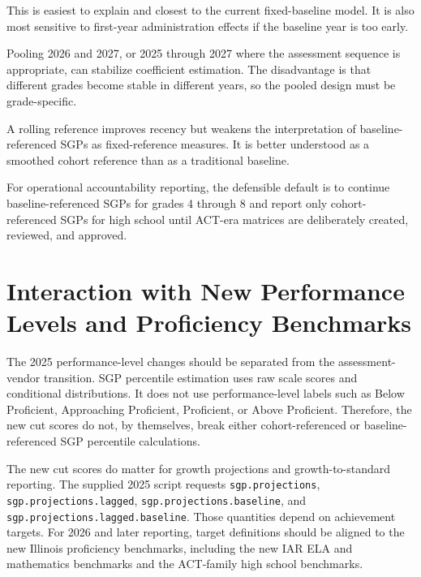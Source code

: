 \documentclass[11pt]{article}
\begin{document}
\begin{description}[leftmargin=1.8em, style=nextline]
\item[Single baseline year.] This is easiest to explain and closest to the current fixed-baseline model. It is also most sensitive to first-year administration effects if the baseline year is too early.
\item[Pooled baseline period.] Pooling 2026 and 2027, or 2025 through 2027 where the assessment sequence is appropriate, can stabilize coefficient estimation. The disadvantage is that different grades become stable in different years, so the pooled design must be grade-specific.
\item[Rolling reference.] A rolling reference improves recency but weakens the interpretation of baseline-referenced SGPs as fixed-reference measures. It is better understood as a smoothed cohort reference than as a traditional baseline.
\end{description}

For operational accountability reporting, the defensible default is to continue baseline-referenced SGPs for grades 4 through 8 and report only cohort-referenced SGPs for high school until ACT-era matrices are deliberately created, reviewed, and approved.

\section{Interaction with New Performance Levels and Proficiency Benchmarks}

The 2025 performance-level changes should be separated from the assessment-vendor transition. SGP percentile estimation uses raw scale scores and conditional distributions. It does not use performance-level labels such as Below Proficient, Approaching Proficient, Proficient, or Above Proficient. Therefore, the new cut scores do not, by themselves, break either cohort-referenced or baseline-referenced SGP percentile calculations.

The new cut scores do matter for growth projections and growth-to-standard reporting. The supplied 2025 script requests \texttt{sgp.projections}, \texttt{sgp.projections.lagged}, \texttt{sgp.projections.baseline}, and \texttt{sgp.projections.lagged.baseline}. Those quantities depend on achievement targets. For 2026 and later reporting, target definitions should be aligned to the new Illinois proficiency benchmarks, including the new IAR ELA and mathematics benchmarks and the ACT-family high school benchmarks.
\end{document}
